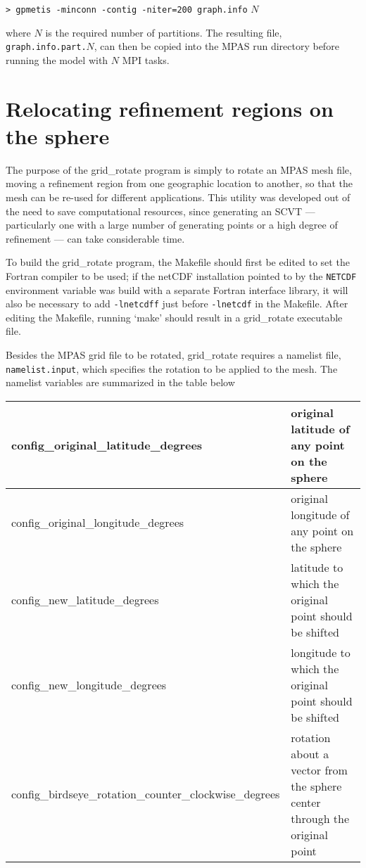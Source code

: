 \vspace{12pt}
{\tt > gpmetis -minconn -contig -niter=200 graph.info} $N$
\vspace{12pt}

\noindent where $N$ is the required number of partitions. The resulting file, {\tt graph.info.part.}$N$, 
can then be copied into the MPAS run directory before running the model with $N$ MPI tasks.


\section{Relocating refinement regions on the sphere}
\label{sec:grid_rotate} 

The purpose of the grid\_rotate program is simply to rotate an MPAS mesh file,
moving a refinement region from one geographic location to another, so that the
mesh can be re-used for different applications. This utility was developed out
of the need to save computational resources, since generating an SCVT ---
particularly one with a large number of generating points or a high degree of
refinement --- can take considerable time.

To build the grid\_rotate program, the Makefile should first be edited to set
the Fortran compiler to be used; if the netCDF installation pointed to by the
{\tt NETCDF} environment variable was build with a separate Fortran interface
library, it will also be necessary to add {\tt -lnetcdff} just before {\tt -lnetcdf} in 
the Makefile. After editing the Makefile, running `make' should
result in a grid\_rotate executable file.

Besides the MPAS grid file to be rotated, grid\_rotate requires a namelist file,
{\tt namelist.input}, which specifies the rotation to be applied to the mesh.
The namelist variables are summarized in the table below
   
\vspace{12pt}
\begin{longtable}{|p{3.25in} |p{2.5in}|}
\hline
config\_original\_latitude\_degrees & original latitude of any point on the sphere \\ \hline
config\_original\_longitude\_degrees & original longitude of any point on the sphere \\ \hline
config\_new\_latitude\_degrees &  latitude to which the original point should be shifted \\ \hline
config\_new\_longitude\_degrees &  longitude to which the original point should be shifted \\ \hline
config\_birdseye\_rotation\_counter\_clockwise\_degrees & rotation about a vector from the sphere center through the original point \\ \hline
\end{longtable}
\vspace{12pt}

